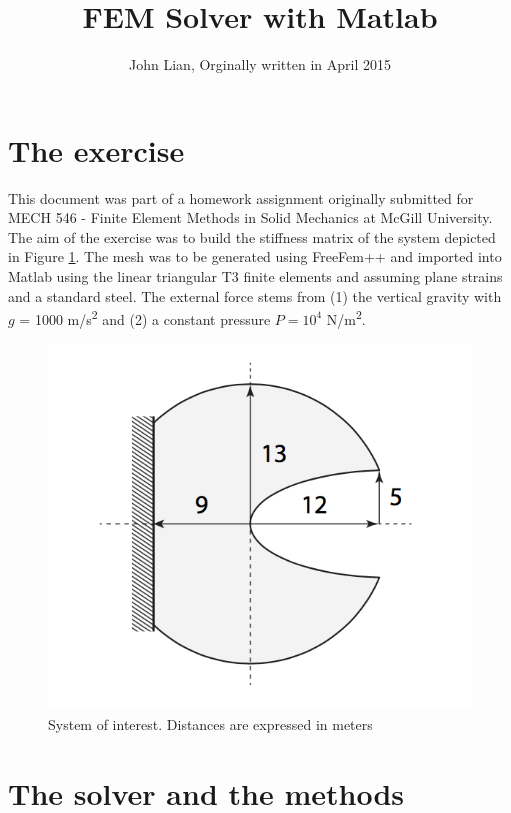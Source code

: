 \documentclass[11pt,fleqn]{article}
\title{FEM Solver with Matlab}
\author{John Lian, Orginally written in April 2015}
\begin{document}
\maketitle                              %

\section{The exercise}

This document was part of a homework assignment originally submitted for MECH 546 - Finite Element Methods in Solid Mechanics at McGill University. 
The aim of the exercise was to build the stiffness matrix of the system depicted in Figure \ref{fig:exercise}. The mesh was to be generated using FreeFem++ and imported into Matlab using the linear triangular T3 finite  elements and assuming plane strains and a standard steel. The external force stems from (1) the vertical gravity with $g$ = 1000 m/s\textsuperscript{2} and (2) a constant pressure $P = 10^4$ N/m\textsuperscript{2}.

\begin{figure}[!h]
    \centering
    \includegraphics{exercise.png}
    \caption{System of interest. Distances are expressed in meters}
    \label{fig:exercise}
\end{figure}

\section{The solver and the methods} 
\end{document}
